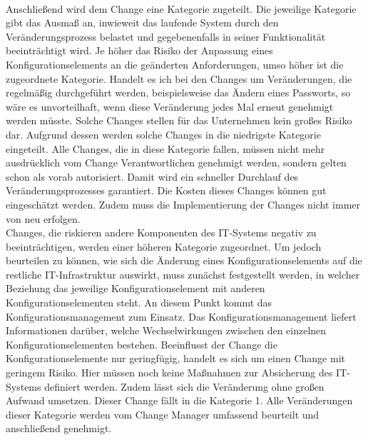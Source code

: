 \\
Anschließend wird dem Change eine Kategorie zugeteilt. Die jeweilige Kategorie gibt das Ausmaß an, inwieweit das laufende System durch den Veränderungsprozess belastet und gegebenenfalls in seiner Funktionalität beeinträchtigt wird. Je höher das Risiko der Anpassung eines Konfigurationselements an die geänderten Anforderungen, umso höher ist die zugeordnete Kategorie. Handelt es ich bei den Changes um Veränderungen, die regelmäßig durchgeführt werden, beispielsweise das Ändern eines Passworts, so wäre es unvorteilhaft, wenn diese Veränderung jedes Mal erneut genehmigt werden müsste. Solche Changes stellen für das Unternehmen kein großes Risiko dar. Aufgrund dessen werden solche Changes in die niedrigste Kategorie eingeteilt. Alle Changes, die in diese Kategorie fallen, müssen nicht mehr ausdrücklich vom Change Verantwortlichen genehmigt werden, sondern gelten schon als vorab autorisiert. Damit wird ein schneller Durchlauf des Veränderungsprozesses garantiert. Die Kosten dieses Changes können gut eingeschätzt werden. Zudem muss die Implementierung der Changes nicht immer von neu erfolgen. 
\\
Changes, die riskieren andere Komponenten des IT-Systems negativ zu beeinträchtigen, werden einer höheren Kategorie zugeordnet. Um jedoch beurteilen zu können, wie sich die Änderung eines Konfigurationselements auf die restliche IT-Infrastruktur auswirkt, muss zunächst festgestellt werden, in welcher Beziehung das jeweilige Konfigurationselement mit anderen Konfigurationselementen steht. An diesem Punkt kommt das Konfigurationsmanagement zum Einsatz. Das Konfigurationsmanagement liefert Informationen darüber,  welche Wechselwirkungen zwischen den einzelnen Konfigurationselementen bestehen. Beeinflusst der Change die Konfigurationselemente nur geringfügig, handelt es sich um einen Change mit geringem Risiko. Hier müssen noch keine Maßnahmen zur Absicherung des IT-Systems definiert werden. Zudem lässt sich die Veränderung ohne großen Aufwand umsetzen. Dieser Change fällt in die Kategorie 1. Alle Veränderungen dieser Kategorie werden vom Change Manager umfassend beurteilt und anschließend genehmigt. 

